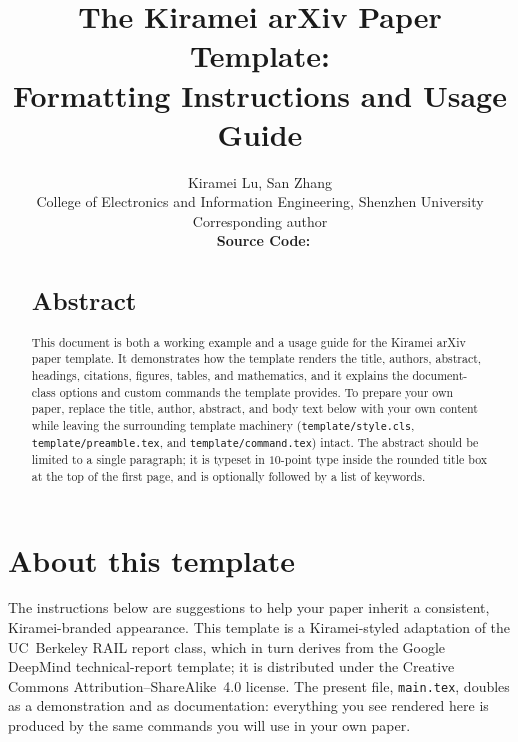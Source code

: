 \documentclass[11pt,letterpaper,twocolumn]{template/style}
\title{The Kiramei arXiv Paper Template:\\ Formatting Instructions and Usage Guide}
\author{Kiramei Lu\affmark{1}, San Zhang\affmark{†}\\
\affmark{1}College of Electronics and Information Engineering, Shenzhen University\\
{\footnotesize\affmark{†}Corresponding author}\\
\faGithub~\textbf{Source Code:} \href{https://github.com/Kiramei/Kiramei}{\monobold{https://github.com/Kiramei/Kiramei}}
}
\begin{document}
\raggedbottom


\begin{abstract}
\vspace{-1mm}
\section*{Abstract}
This document is both a working example and a usage guide for the Kiramei arXiv
paper template. It demonstrates how the template renders the title, authors,
abstract, headings, citations, figures, tables, and mathematics, and it explains
the document-class options and custom commands the template provides. To prepare
your own paper, replace the title, author, abstract, and body text below with
your own content while leaving the surrounding template machinery
(\texttt{template/style.cls}, \texttt{template/preamble.tex}, and \texttt{template/command.tex})
intact. The abstract should be limited to a single paragraph; it is typeset in
$10$-point type inside the rounded title box at the top of the first page, and is
optionally followed by a list of keywords.
\end{abstract}


\maketitle


\section{About this template}
\label{sec:about}

The instructions below are suggestions to help your paper inherit a
consistent, Kiramei-branded appearance. This template is a Kiramei-styled adaptation of
the UC~Berkeley RAIL report class, which in turn derives from the Google DeepMind
technical-report template; it is distributed under the Creative Commons
Attribution--ShareAlike~4.0 license. The present file, \verb+main.tex+,
doubles as a demonstration and as documentation: everything you see rendered here
is produced by the same commands you will use in your own paper.
\end{document}
